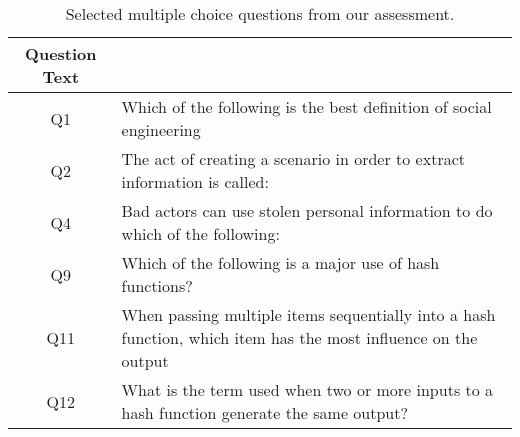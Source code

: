 \begin{table}[h]
  \scriptsize
  \begin{tabular}{c | p{6cm}}
Question Text  &     \\
\hline
Q1 & Which of the following is the best definition of social engineering \\
Q2  & The act of creating a scenario in order to extract information is called:   \\
Q4  & Bad actors can use stolen personal information to do which of the following: \\
Q9 & Which of the following is a major use of hash functions? \\
Q11 & When passing multiple items sequentially into a hash function, which item has the most influence on the output \\
Q12 & What is the term used when two or more inputs to a hash function generate the same output? \\
\end{tabular}
\caption{Selected multiple choice questions from our assessment.}
\label{fig:assessment}
\end{table}



